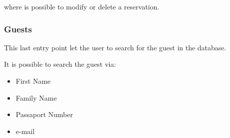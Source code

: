 where is possible to modify or delete a reservation.


\subsubsection{Guests}

This last entry point let the user to search for the guest in the database.

It is possible to search the guest via:

\begin {itemize}
  \item First Name
  \item Family Name
  \item Passaport Number
  \item e-mail
\end{itemize}


